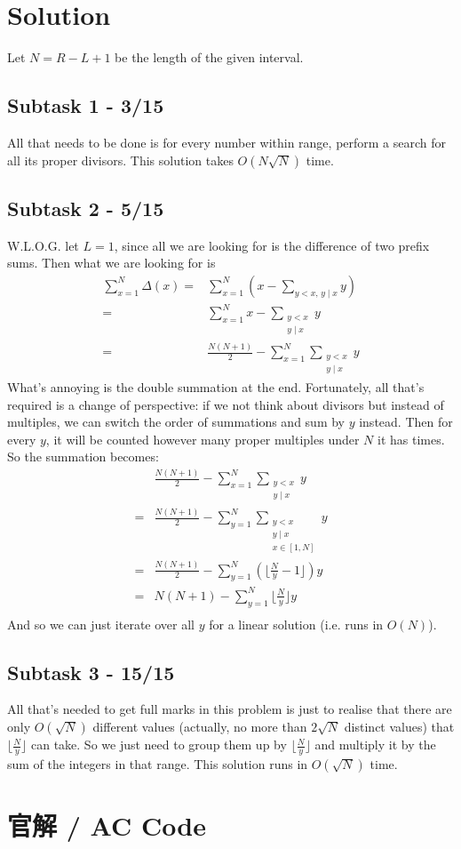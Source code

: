 \documentclass[12pt,a4paper]{article}
\newcommand{\floor}[1]{\lfloor#1\rfloor}
\newcommand{\divs}{\;|\;}
\theoremstyle{mystyle}	%
\begin{document}
	\section*{Solution}
	Let $N = R - L + 1$ be the length of the given interval.
	\subsection*{Subtask 1 - 3/15}
		All that needs to be done is for every number within range, perform a search for all its proper divisors. This solution takes $O(N\sqrt{N})$ time. 
	\subsection*{Subtask 2 - 5/15}
		W.L.O.G. let $L = 1$, since all we are looking for is the difference of two prefix sums. Then what we are looking for is
		\begin{align*}
			\sum_{x = 1}^N \Delta(x) =&\sum_{x = 1}^{N} \left(x - \sum_{y < x,\, y \divs x} y\right)\\
			= &\sum_{x = 1}^{N}x -  \sum_{\substack{y < x\\ y \divs x}} y\\
			= &\frac{N(N + 1)}{2} - \sum_{x = 1}^{N} \sum_{\substack{y < x\\ y \divs x}} y
		\end{align*}
		What's annoying is the double summation at the end. Fortunately, all that's required is a change of perspective: if we not think about divisors but instead of multiples, we can switch the order of summations and sum by $y$ instead. Then for every $y$, it will be counted however many proper multiples under $N$ it has times. So the summation becomes: 
		\begin{align*}
			&\frac{N(N + 1)}{2} - \sum_{x = 1}^{N} \sum_{\substack{y < x\\ y \divs x}} y\\
			= &\frac{N(N + 1)}{2} - \sum_{y = 1}^{N} \sum_{\substack{y < x\\y \divs x\\x \in [1, N]}} y\\
			= &\frac{N(N + 1)}{2} - \sum_{y = 1}^{N} \left(\floor{\frac{N}{y} - 1}\right)y\\
			= &N(N + 1) - \sum_{y = 1}^{N} \floor{\frac{N}{y}}y\\
		\end{align*}
		And so we can just iterate over all $y$ for a linear solution (i.e. runs in $O(N)$).
	\subsection*{Subtask 3 - 15/15}
		All that's needed to get full marks in this problem is just to realise that there are only $O(\sqrt{N})$ different values (actually, no more than $2\sqrt{N}$ distinct values) that $\floor{\frac{N}{y}}$ can take. So we just need to group them up by $\floor{\frac{N}{y}}$ and multiply it by the sum of the integers in that range. This solution runs in $O(\sqrt{N})$ time.
		
	\newpage
	\section*{官解 / AC Code}
	\inputminted[mathescape, linenos,tabsize=4,breaklines,bgcolor=bg]{c++}{./p7_sol.cpp}
		
	
\end{document}
